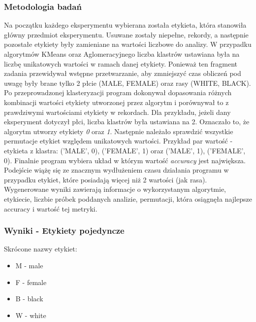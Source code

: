 \documentclass{classrep}
\begin{document}
{{            \subsubsection{Metodologia badań}
            Na początku każdego eksperymentu wybierana została etykieta, która stanowiła główny przedmiot
            eksperymentu. Usuwane zostały niepełne, rekordy, a następnie pozostałe etykiety były zamieniane na
            wartości liczbowe do analizy. W przypadku algorytmów KMeans oraz Aglomeracyjnego liczba klastrów
            ustawiana była na liczbę unikatowych wartości w ramach danej etykiety. Ponieważ ten fragment zadania
            przewidywał wstępne przetwarzanie, aby zmniejszyć czas obliczeń pod uwagę były brane tylko 2 płcie (MALE,
            FEMALE) oraz rasy (WHITE, BLACK). Po przeprowadzonej klasteryzacji program dokonywał dopasowania różnych
            kombinacji wartości etykiety utworzonej przez algorytm i porównywał to z prawdziwymi wartościami etykiety
            w rekordach. Dla przykładu, jeżeli dany eksperyment dotyczył płci, liczba klastrów była ustawiana na 2.
            Oznaczało to, że algorytm utworzy etykiety \textit{0} oraz \textit{1}. Następnie należało sprawdzić
            wszystkie permutacje etykiet względem unikatowych wartości.
            Przykład par wartość - etykieta z klastra:
            ('MALE', 0), ('FEMALE', 1) oraz
            ('MALE', 1), ('FEMALE', 0). Finalnie program wybiera układ w którym wartość \textit{accuracy} jest największa.
            Podejście wiążę się ze znacznym wydłużeniem czasu działania programu w przypadku etykiet, które posiadają
            więcej niż 2 wartości (jak rasa).
            Wygenerowane wyniki zawierają informacje o wykorzystanym algorytmie, etykiecie, liczbie próbek poddanych
            analizie, permutacji, która osiągnęła najlepsze accuracy i wartość tej metryki.

            \subsubsection{Wyniki - Etykiety pojedyncze}

            Skrócone nazwy etykiet:
            \begin{itemize}
                \item M - male
                \item F - female
                \item B - black
                \item W - white
            \end{itemize}

}}
\end{document}
